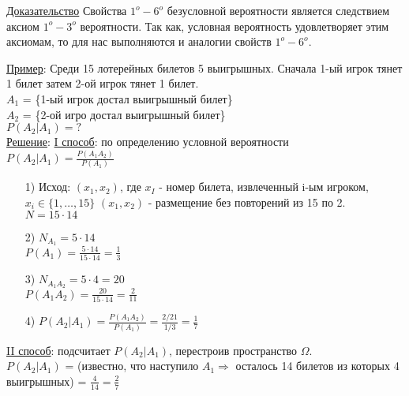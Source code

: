 \underline{Доказательство}
Свойства $1^o - 6^o$ безусловной вероятности является следствием аксиом $1^o - 3^o$ вероятности. Так как, условная вероятность удовлетворяет этим аксиомам, то для нас выполняются и аналогии свойств $1^o - 6^o$.

\underline{Пример}: Среди 15 лотерейных билетов 5 выигрышных. Сначала 1-ый игрок тянет 1 билет затем 2-ой игрок тянет 1 билет. \\
$A_1$ = \{1-ый игрок достал выигрышный билет\} \\
$A_2$ = \{2-ой игро достал выигрышный билет\} \\
$P(A_2|A_1) = ?$ \\

\underline{Решение}: 
\underline{I способ}: по определению условной вероятности \\
$P(A_2|A_1) = \frac{P(A_1 A_2)}{P(A_1)}$ \\
\begin{enumerate}
	\item[1)] 
	Исход: $(x_1, x_2)$, где $x_I$ - номер билета, извлеченный i-ым игроком, $x_i \in \{1, \ldots , 15\}$
	$(x_1, x_2)$ - размещение без повторений из 15 по 2. \\
	$N = 15 \cdot 14$ \\
	
	\item[2)]
	$N_{A_1} = 5 \cdot 14$ \\
	$P(A_1) = \frac{5 \cdot 14}{15 \cdot 14} = \frac{1}{3}$
	
	\item[3)]
	$N_{A_1 A_2} = 5 \cdot 4 = 20$ \\
	$P(A_1 A_2) = \frac{20}{15 \cdot 14} = \frac{2}{11}$ \\
	
	\item[4)]
	$P(A_2|A_1) = \frac{P(A_1 A_2)}{P(A_1)} = \frac{2/21}{1/3} = \frac{1}{7}$ \\
\end{enumerate}

\underline{II способ}: подсчитает $P(A_2|A_1)$, перестроив пространство $\Omega$. \\
$P(A_2|A_1)$ = (известно, что наступило $A_1 \Rightarrow$ осталось 14 билетов из которых 4 выигрышных) = $\frac{4}{14} = \frac{2}{7}$



























